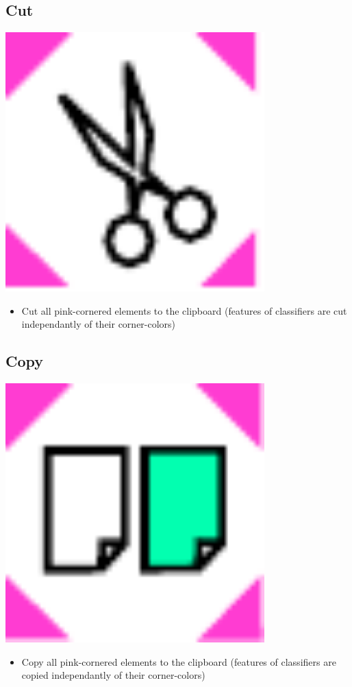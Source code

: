 \subsection{Cut}

\includegraphics[width=10cm]{../../gui/source/resources/edit_cut.pdf}
\begin{itemize}
\item Cut all pink-cornered elements to the clipboard (features of classifiers are cut independantly of their corner-colors)
\end{itemize}

\subsection{Copy}

\includegraphics[width=10cm]{../../gui/source/resources/edit_copy.pdf}
\begin{itemize}
\item Copy all pink-cornered elements to the clipboard (features of classifiers are copied independantly of their corner-colors)
\end{itemize}


